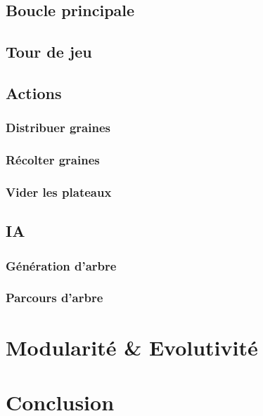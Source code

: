 \documentclass[]{article}
\begin{document}
\subsection{Boucle principale}

\subsection{Tour de jeu}



\subsection{Actions}

\subsubsection{Distribuer graines}

\subsubsection{Récolter graines}

\subsubsection{Vider les plateaux}



\subsection{IA}

\subsubsection{Génération d'arbre}

\subsubsection{Parcours d'arbre}

\section{Modularité \& Evolutivité}

\section{Conclusion}
\end{document}
